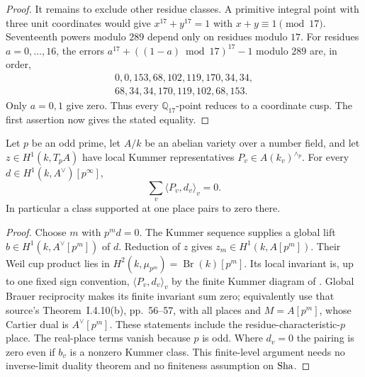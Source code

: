 \begin{proof}
It remains to exclude other residue classes.  A primitive
integral point with three unit coordinates would give
$x^{17}+y^{17}=1$ with $x+y\equiv1\pmod {17}$.
Seventeenth powers modulo $289$ depend only on residues
modulo $17$.  For residues $a=0,\ldots,16$, the errors
$a^{17}+((1-a)\bmod17)^{17}-1$ modulo $289$ are, in order,
\[
 \begin{gathered}
 0,0,153,68,102,119,170,34,34,\\
 68,34,34,170,119,102,68,153.
 \end{gathered}
\]
Only $a=0,1$ give zero.  Thus every $\mathbb Q_{17}$-point
reduces to a coordinate cusp.  The first assertion now gives
the stated equality.
\end{proof}

\begin{lemma}\label{lem:finite-primary-reciprocity}
Let $p$ be an odd prime, let $A/k$ be an abelian variety over a number
field, and let $z\in H^1(k,T_pA)$ have local Kummer representatives
$P_v\in A(k_v)^{\wedge_p}$. For every
$d\in H^1(k,A^\vee)[p^\infty]$,
\[
 \sum_v\langle P_v,d_v\rangle_v=0.
\]
In particular a class supported at one place pairs to zero there.
\end{lemma}
\begin{proof}
Choose $m$ with $p^md=0$. The Kummer sequence supplies a global
lift $b\in H^1(k,A^\vee[p^m])$ of $d$. Reduction of $z$ gives
$z_m\in H^1(k,A[p^m])$. Their Weil cup product lies in
$H^2(k,\mu_{p^m})=\operatorname{Br}(k)[p^m]$.
Its local invariant is, up to one fixed sign convention,
$\langle P_v,d_v\rangle_v$ by the finite Kummer diagram of
\citet[Theorem~I.3.2, Corollary~I.3.4 and Remark~I.3.5,
pp.~41--44]{Milne2006ADT}. Global Brauer reciprocity makes
its finite invariant sum zero; equivalently use that source's
Theorem~I.4.10(b), pp.~56--57, with all places and
$M=A[p^m]$, whose Cartier dual is $A^\vee[p^m]$.
These statements include the residue-characteristic-$p$ place.
The real-place terms vanish because $p$ is odd.
Where $d_v=0$ the pairing is zero even if $b_v$ is a nonzero
Kummer class. This finite-level argument needs no inverse-limit
duality theorem and no finiteness assumption on $\operatorname{Sha}$.
\end{proof}

